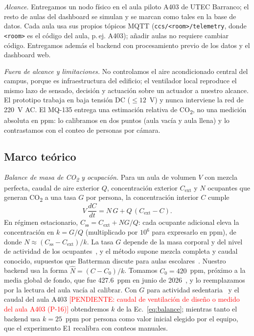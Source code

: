 \documentclass[manuscript,screen,nonacm,natbib=false]{acmart}
\newcommand{\pendiente}[1]{\textcolor{red}{[PENDIENTE: #1]}}
\newcommand{\COdos}{CO\textsubscript{2}}
\begin{document}
\textit{Alcance.} Entregamos un nodo físico en el aula piloto A403 de UTEC Barranco; el resto de aulas del dashboard se simulan y se marcan como tales en la base de datos. Cada aula usa sus propios tópicos MQTT (\texttt{ccs/<room>/telemetry}, donde \texttt{<room>} es el código del aula, p.\,ej. A403); añadir aulas no requiere cambiar código. Entregamos además el backend con procesamiento previo de los datos y el dashboard web.

\textit{Fuera de alcance y limitaciones.} No controlamos el aire acondicionado central del campus, porque es infraestructura del edificio; el ventilador local reproduce el mismo lazo de sensado, decisión y actuación sobre un actuador a nuestro alcance. El prototipo trabaja en baja tensión DC ($\leq 12$~V) y nunca interviene la red de 220~V AC. El MQ-135 entrega una estimación relativa de \COdos{}, no una medición absoluta en ppm: lo calibramos en dos puntos (aula vacía y aula llena) y lo contrastamos con el conteo de personas por cámara.

\subsection{Marco teórico}
\label{sec:marco}

\textit{Balance de masa de \COdos{} y ocupación.} Para un aula de volumen $V$ con mezcla perfecta, caudal de aire exterior $Q$, concentración exterior $C_{\mathrm{ext}}$ y $N$ ocupantes que generan \COdos{} a una tasa $G$ por persona, la concentración interior $C$ cumple
\begin{equation}
V\,\frac{dC}{dt} = N\,G + Q\,(C_{\mathrm{ext}} - C).
\label{eq:balance}
\end{equation}
En régimen estacionario, $C_{\mathrm{ss}} = C_{\mathrm{ext}} + NG/Q$: cada ocupante adicional eleva la concentración en $k = G/Q$ (multiplicado por $10^6$ para expresarlo en ppm), de donde $N \approx (C_{\mathrm{ss}}-C_{\mathrm{ext}})/k$. La tasa $G$ depende de la masa corporal y del nivel de actividad de los ocupantes~\cite{persily2017co2}, y el método supone mezcla completa y caudal conocido, supuestos que Batterman discute para aulas escolares~\cite{batterman2017review}. Nuestro backend usa la forma $\hat N = (C - C_0)/k$. Tomamos $C_0 = 420$~ppm, próximo a la media global de fondo, que fue 427.6~ppm en junio de 2026~\cite{noaa2026trends}, y lo reemplazamos por la lectura del aula vacía al calibrar. Con $G$ para actividad sedentaria~\cite{persily2017co2} y el caudal del aula A403 \pendiente{caudal de ventilación de diseño o medido del aula A403 (P-16)} obtendremos $k$ de la Ec.~\eqref{eq:balance}; mientras tanto el backend usa $k = 25$~ppm por persona como valor inicial elegido por el equipo, que el experimento E1 recalibra con conteos manuales.
\end{document}
